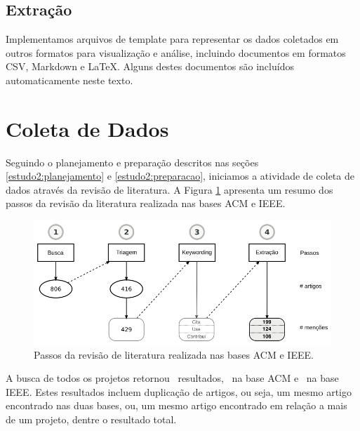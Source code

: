 \subsection{Extração}

Implementamos arquivos de template para representar os dados coletados em
outros formatos para visualização e análise, incluindo documentos em formatos
CSV, Markdown e \LaTeX. Alguns destes documentos são incluídos automaticamente
neste texto.


\section{Coleta de Dados} \label{estudo2:coleta} %

Seguindo o planejamento e preparação descritos nas seções
\ref{estudo2:planejamento} e \ref{estudo2:preparacao}, iniciamos a atividade de coleta de
dados através da revisão de literatura.
A Figura \ref{estudo2-revisao-literatura} apresenta um resumo dos passos da revisão da literatura
realizada nas bases ACM e IEEE.

\begin{figure}[h]
  \center
  \includegraphics[scale=0.35]{imagens/estudo2-revisao-literatura.png}
  \caption{Passos da revisão de literatura realizada nas bases ACM e IEEE.}
  \label{estudo2-revisao-literatura}
\end{figure}



A busca de todos os projetos retornou \SearchCount \ resultados,
\SearchACMCount \ na base ACM e \SearchIEEECount \ na base IEEE.
Estes resultados incluem duplicação de artigos, ou seja,
um mesmo artigo encontrado nas duas bases, ou, um mesmo artigo
encontrado em relação a mais de um projeto, dentre o resultado total.

